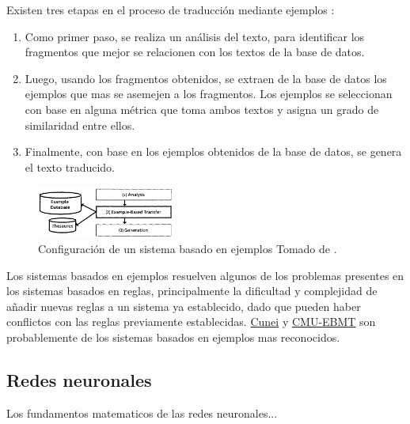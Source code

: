 \documentclass[12pt, letterpaper]{article}
\begin{document}
\begin{multicols}{2}
                Existen tres etapas en el proceso de traducción mediante ejemplos \cite{Nagao}\cite{Sumita2005TranslatingWE}:
                \begin{enumerate}
                    \item Como primer paso, se realiza un análisis del texto, para identificar los fragmentos que mejor se relacionen con los textos de la base de
                    datos.
                    \item Luego, usando los fragmentos obtenidos, se extraen de la base de datos los ejemplos que mas se asemejen a los fragmentos. Los ejemplos se
                    seleccionan con base en alguna métrica que toma ambos textos y asigna un grado de similaridad entre ellos.  
                    \item Finalmente, con base en los ejemplos obtenidos de la base de datos, se genera el texto traducido.
                \end{enumerate}

                \begin{figure}[H]
                    \centering
                    \includegraphics[width=0.4\textwidth]{example.png}
                    \caption[]{Configuración de un sistema basado en ejemplos Tomado de \cite{Sumita2005TranslatingWE}.}
                    \label{example}
                \end{figure}
                 
                Los sistemas basados en ejemplos resuelven algunos de los problemas presentes en los sistemas basados en reglas\cite{Sumita2005TranslatingWE}, principalmente
                la dificultad y complejidad de añadir nuevas reglas a un sistema ya establecido, dado que pueden haber conflictos con las reglas previamente establecidas. 
                \href{http://cunei.sourceforge.net/}{Cunei} y \href{http://www.cs.cmu.edu/~ralf/ebmt/ebmt.html}{CMU-EBMT} son probablemente de los sistemas basados en ejemplos
                mas reconocidos.
            \subsection{Redes neuronales}
                Los fundamentos matematicos de las redes neuronales...

            
            
    \end{multicols}
    
\end{document}

